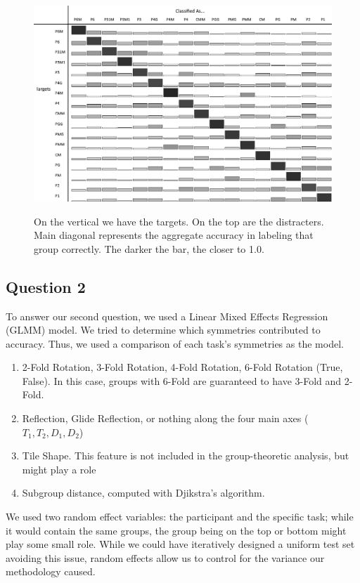 \begin{figure}[!ht]
\centering
\includegraphics[width=0.9\columnwidth]{accuracies-grayscale}
\label{fullacc}
\caption{On the vertical we have the targets. On the top are the distracters. Main diagonal represents the aggregate accuracy in labeling that group correctly. The darker the bar, the closer to 1.0.}
\end{figure}

\subsection{Question 2}
To answer our second question, we used a Linear Mixed Effects Regression (GLMM) model. We tried to determine which symmetries contributed to accuracy. Thus, we used a comparison of each task's symmetries as the model.
\begin{enumerate}
\item 2-Fold Rotation, 3-Fold Rotation, 4-Fold Rotation, 6-Fold Rotation (True, False). In this case, groups with 6-Fold are guaranteed to have 3-Fold and 2-Fold.
\item Reflection, Glide Reflection, or nothing along the four main axes ($T_1, T_2, D_1, D_2$)
\item Tile Shape. This feature is not included in the group-theoretic analysis, but might play a role
\item Subgroup distance, computed with Djikstra's algorithm. 
\end{enumerate}

We used two random effect variables: the participant and the specific task; while it would contain the same groups, the group being on the top or bottom might play some small role. While we could have iteratively designed a uniform test set avoiding this issue, random effects allow us to control for the variance our methodology caused.

